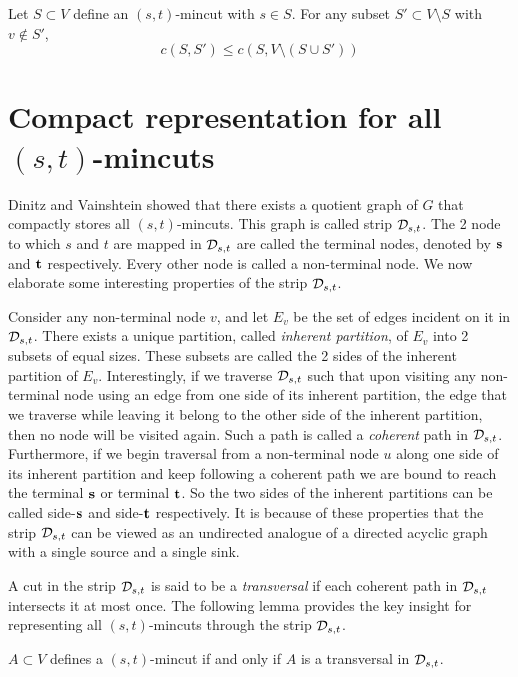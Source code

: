 \begin{lemma}
Let $S \subset V$ define an $(s,t)$-mincut with $s\in S$. For any subset $S'\subset V\setminus S$ with $v\notin S'$,
\[ 
c(S,S') \le c(S,V\setminus (S\cup S'))
\]
\label{lem:subset-property-of-min-cut}
\end{lemma}
\vspace{-10mm}
\section{Compact representation for all \texorpdfstring{$(s,t)$}{(s,t)}-mincuts}
Dinitz and Vainshtein \cite{DBLP:journals/siamcomp/DinitzV00} showed that there exists a quotient graph of $G$ that compactly stores all $(s,t)$-mincuts. This graph is called strip ${\cal D}_{s,t}$. The 2 node to which $s$ and $t$ are mapped in ${\cal D}_{s,t}$ are called the terminal nodes, denoted by ${\bf s}$ and ${\bf t}$ respectively. Every other node is called a non-terminal node. We now elaborate some interesting properties of the strip ${\cal D}_{s,t}$.

 Consider any non-terminal node $v$, and let $E_v$ be the set of edges incident on it in ${\cal D}_{s,t}$. There exists a unique partition, called {\em inherent partition}, of $E_v$ into 2 subsets of equal sizes. These subsets are called the 2 sides of the inherent partition of $E_v$. 
 Interestingly, if we traverse ${\cal D}_{s,t}$ such that upon visiting any non-terminal node using an edge from one side of its inherent partition, the edge that we traverse while leaving it belong to the other side of the inherent partition, then no node will be visited again. Such a path is called a {\em coherent} path in ${\cal D}_{s,t}$. Furthermore, if we begin traversal from a non-terminal node $u$ along one side of its inherent partition and keep following a coherent path we are bound to reach the terminal ${\bf s}$ or terminal ${\bf t}$. So the two sides of the inherent partitions can be called side-${\bf s}$
 and side-${\bf t}$ respectively.
It is because of these properties
that the strip ${\cal D}_{s,t}$ can be viewed as an undirected analogue of a directed acyclic graph with a single source and a single sink. 

A cut in the strip ${\cal D}_{s,t}$ is said to be a \textit{transversal} if each coherent path in ${\cal D}_{s,t}$ intersects it at most once. The following lemma provides the key insight for representing all $(s,t)$-mincuts through the strip ${\cal D}_{s,t}$.
\begin{lemma}
    $A\subset V$ defines a $(s,t)$-mincut if and only if $A$ is a transversal in ${\cal D}_{s,t}$.
    \label{lem:mincut-transversal}
\end{lemma}


